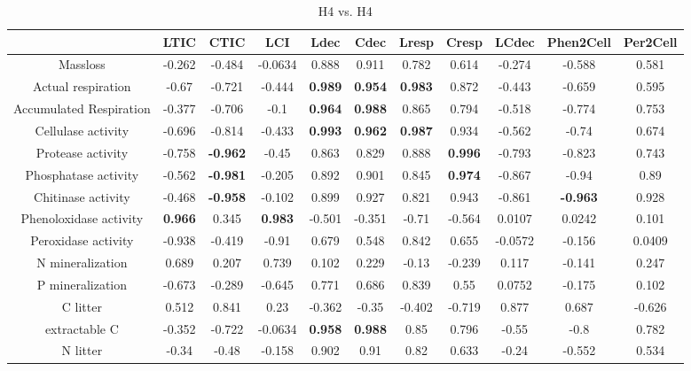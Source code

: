 \documentclass[authoryear,preprint,review,12pt]{elsarticle}
\begin{document}
\begin{table}[h!]
\begin{center}
\caption{H4 vs. H4}
\label{morecorr1}
{\tiny
\begin{tabular}{ccccccccccc}
  \hline
 & LTIC & CTIC & LCI & Ldec & Cdec & Lresp & Cresp & LCdec & Phen2Cell & Per2Cell \\ 
  \hline
Massloss & -0.262 & -0.484 & -0.0634 & 0.888 & 0.911 & 0.782 & 0.614 & -0.274 & -0.588 & 0.581 \\ 
  Actual respiration & -0.67 & -0.721 & -0.444 & \textbf{ 0.989 } & \textbf{ 0.954 } & \textbf{ 0.983 } & 0.872 & -0.443 & -0.659 & 0.595 \\ 
  Accumulated Respiration & -0.377 & -0.706 & -0.1 & \textbf{ 0.964 } & \textbf{ 0.988 } & 0.865 & 0.794 & -0.518 & -0.774 & 0.753 \\ 
  Cellulase activity & -0.696 & -0.814 & -0.433 & \textbf{ 0.993 } & \textbf{ 0.962 } & \textbf{ 0.987 } & 0.934 & -0.562 & -0.74 & 0.674 \\ 
  Protease activity & -0.758 & \textbf{ -0.962 } & -0.45 & 0.863 & 0.829 & 0.888 & \textbf{ 0.996 } & -0.793 & -0.823 & 0.743 \\ 
  Phosphatase activity & -0.562 & \textbf{ -0.981 } & -0.205 & 0.892 & 0.901 & 0.845 & \textbf{ 0.974 } & -0.867 & -0.94 & 0.89 \\ 
  Chitinase activity & -0.468 & \textbf{ -0.958 } & -0.102 & 0.899 & 0.927 & 0.821 & 0.943 & -0.861 & \textbf{ -0.963 } & 0.928 \\ 
  Phenoloxidase activity & \textbf{ 0.966 } & 0.345 & \textbf{ 0.983 } & -0.501 & -0.351 & -0.71 & -0.564 & 0.0107 & 0.0242 & 0.101 \\ 
  Peroxidase activity & -0.938 & -0.419 & -0.91 & 0.679 & 0.548 & 0.842 & 0.655 & -0.0572 & -0.156 & 0.0409 \\ 
  N mineralization & 0.689 & 0.207 & 0.739 & 0.102 & 0.229 & -0.13 & -0.239 & 0.117 & -0.141 & 0.247 \\ 
  P mineralization & -0.673 & -0.289 & -0.645 & 0.771 & 0.686 & 0.839 & 0.55 & 0.0752 & -0.175 & 0.102 \\ 
  C litter & 0.512 & 0.841 & 0.23 & -0.362 & -0.35 & -0.402 & -0.719 & 0.877 & 0.687 & -0.626 \\ 
  extractable C & -0.352 & -0.722 & -0.0634 & \textbf{ 0.958 } & \textbf{ 0.988 } & 0.85 & 0.796 & -0.55 & -0.8 & 0.782 \\ 
  N litter & -0.34 & -0.48 & -0.158 & 0.902 & 0.91 & 0.82 & 0.633 & -0.24 & -0.552 & 0.534 \\ 

\end{tabular}}
\end{center}
\end{table}
\end{document}
